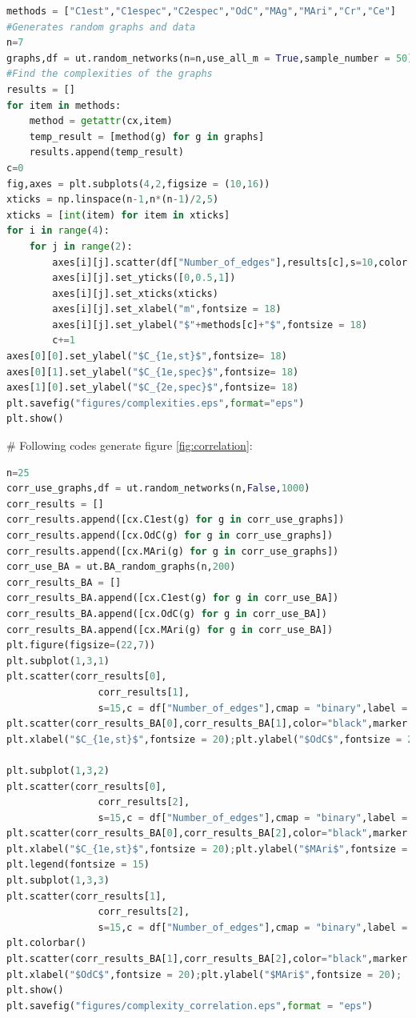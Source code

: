 \documentclass[12pt]{article}
\begin{document}
\begin{lstlisting}[breaklines=true,language=Python]
methods = ["C1est","C1espec","C2espec","OdC","MAg","MAri","Cr","Ce"]
#Generates random graphs and data
n=7
graphs,df = ut.random_networks(n=n,use_all_m = True,sample_number = 50)
#Find the complexities of the graphs
results = []
for item in methods:
    method = getattr(cx,item)
    temp_result = [method(g) for g in graphs]
    results.append(temp_result)
c=0
fig,axes = plt.subplots(4,2,figsize = (10,16))
xticks = np.linspace(n-1,n*(n-1)/2,5)
xticks = [int(item) for item in xticks]
for i in range(4):
    for j in range(2):
        axes[i][j].scatter(df["Number_of_edges"],results[c],s=10,color = "black")
        axes[i][j].set_yticks([0,0.5,1])
        axes[i][j].set_xticks(xticks)
        axes[i][j].set_xlabel("m",fontsize = 18)
        axes[i][j].set_ylabel("$"+methods[c]+"$",fontsize = 18)
        c+=1
axes[0][0].set_ylabel("$C_{1e,st}$",fontsize= 18)
axes[0][1].set_ylabel("$C_{1e,spec}$",fontsize= 18)
axes[1][0].set_ylabel("$C_{2e,spec}$",fontsize= 18)
plt.savefig("figures/complexities.eps",format="eps")
plt.show()
\end{lstlisting}
\noindent
\newline
\# Following codes generate figure \ref{fig:correlation}:
\begin{lstlisting}[breaklines=true,language=Python]
n=25
corr_use_graphs,df = ut.random_networks(n,False,1000)
corr_results = []
corr_results.append([cx.C1est(g) for g in corr_use_graphs])
corr_results.append([cx.OdC(g) for g in corr_use_graphs])
corr_results.append([cx.MAri(g) for g in corr_use_graphs])
corr_use_BA = ut.BA_random_graphs(n,200)
corr_results_BA = []
corr_results_BA.append([cx.C1est(g) for g in corr_use_BA])
corr_results_BA.append([cx.OdC(g) for g in corr_use_BA])
corr_results_BA.append([cx.MAri(g) for g in corr_use_BA])
plt.figure(figsize=(22,7))
plt.subplot(1,3,1)
plt.scatter(corr_results[0],
                corr_results[1],
                s=15,c = df["Number_of_edges"],cmap = "binary",label = "$G(n,m)$ random graphs")
plt.scatter(corr_results_BA[0],corr_results_BA[1],color="black",marker = "x",label = "BA Graphs")
plt.xlabel("$C_{1e,st}$",fontsize = 20);plt.ylabel("$OdC$",fontsize = 20);

plt.subplot(1,3,2)
plt.scatter(corr_results[0],
                corr_results[2],
                s=15,c = df["Number_of_edges"],cmap = "binary",label = "$G(n,m)$ random graphs")
plt.scatter(corr_results_BA[0],corr_results_BA[2],color="black",marker = "x",label = "BA Graphs")
plt.xlabel("$C_{1e,st}$",fontsize = 20);plt.ylabel("$MAri$",fontsize = 20);
plt.legend(fontsize = 15)
plt.subplot(1,3,3)
plt.scatter(corr_results[1],
                corr_results[2],
                s=15,c = df["Number_of_edges"],cmap = "binary",label = "$G(n,m)$ random graphs")
plt.colorbar()
plt.scatter(corr_results_BA[1],corr_results_BA[2],color="black",marker = "x",label = "BA Graphs")
plt.xlabel("$OdC$",fontsize = 20);plt.ylabel("$MAri$",fontsize = 20);
plt.show()
plt.savefig("figures/complexity_correlation.eps",format = "eps")
\end{lstlisting}
\end{document}
